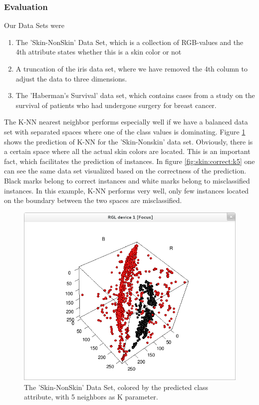 \documentclass[paper=a4, fontsize=11pt]{scrartcl} %
\numberwithin{equation}{section} %
\numberwithin{figure}{section} %
\numberwithin{table}{section} %
\begin{document}
\subsubsection{Evaluation}
Our Data Sets were 
\begin{enumerate}
\item
    The 'Skin-NonSkin' Data Set, which is a collection of RGB-values and the 4th attribute states whether this is a skin color or not
\item
    A truncation of the iris data set, where we have removed the 4th column to adjust the data to three dimensions.
\item
    The 'Haberman's Survival' data set, which contains cases from a study on the survival of patients who had undergone surgery for breast cancer.
\end{enumerate}

The K-NN nearest neighbor performs especially well if we have a balanced data set with separated spaces where one of the class values is dominating. Figure \ref{fig:skin:predicted:k5} shows the prediction of K-NN for the 'Skin-Nonskin' data set. Obviously, there is a certain space where all the actual skin colors are located. This is an important fact, which facilitates the prediction of instances. In figure \ref{fig:skin:correct:k5} one can see the same data set visualized based on the correctness of the prediction. Black marks belong to correct instances and white marks belong to misclassified instances. In this example, K-NN performs very well, only few instances located on the boundary between the two spaces are misclassified.

\begin{figure}[\textwidth]
    \begin{center}
        \includegraphics[width=\textwidth]{Skin_predicted_k5}
    \end{center}
    \caption['Skin-NonSkin' prediction with k=5]{The 'Skin-NonSkin' Data Set, colored by the predicted class attribute, with 5 neighbors as K parameter.}
    \label{fig:skin:predicted:k5}
\end{figure}
\end{document}
